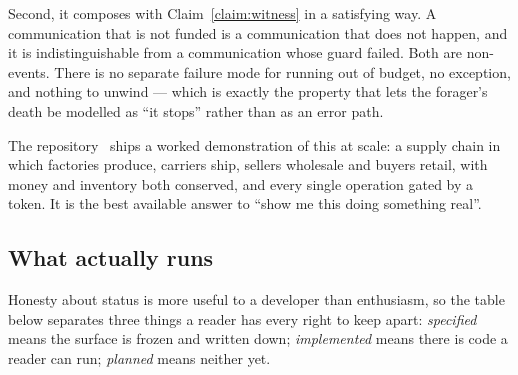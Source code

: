 Second, it composes with Claim~\ref{claim:witness} in a satisfying way. A
communication that is not funded is a communication that does not happen, and it
is indistinguishable from a communication whose guard failed. Both are
non-events. There is no separate failure mode for running out of budget, no
exception, and nothing to unwind --- which is exactly the property that lets the
forager's death be modelled as ``it stops'' rather than as an error path.

The repository~\cite{f1r3node} ships a worked demonstration of this at scale: a supply chain in
which factories produce, carriers ship, sellers wholesale and buyers retail,
with money and inventory both conserved, and every single operation gated by a
token. It is the best available answer to ``show me this doing something real''.

\subsection{What actually runs}
\label{sec:status}

Honesty about status is more useful to a developer than enthusiasm, so the
table below separates three things a reader has every right to keep apart:
\emph{specified} means the surface is frozen and written down; \emph{implemented}
means there is code a reader can run; \emph{planned} means neither yet.

